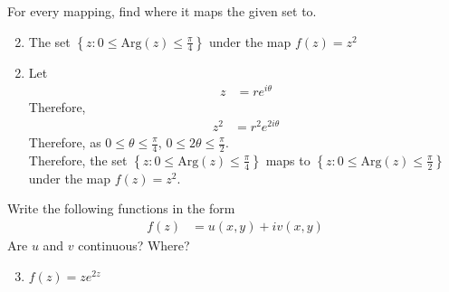 \documentclass[fleqn, a4paper, 11pt, oneside]{amsart}
\theoremstyle{definition}
\theoremstyle{theorem}
\newcommand{\Arg}{\mathrm{Arg}}
\begin{document}
\setcounter{question}{2}
\begin{question}
	For every mapping, find where it maps the given set to.
	\begin{enumerate}[label=({\alph*})]
		\setcounter{enumi}{1}
		\item The set $\left\{ z : 0 \le \Arg(z) \le \frac{\pi}{4} \right\}$ under the map $f(z) = z^2$
	\end{enumerate}
\end{question}

\begin{solution}
	\begin{enumerate}[label=({\alph*}), leftmargin=*]
		\setcounter{enumi}{1}
		\item
			Let
			\begin{align*}
				z &= r e^{i \theta}
			\end{align*}
			Therefore,
			\begin{align*}
				z^2 &= r^2 e^{2 i \theta}
			\end{align*}
			Therefore, as $0 \le \theta \le \frac{\pi}{4}$, $0 \le 2 \theta \le \frac{\pi}{2}$.\\
			Therefore, the set $\left\{ z : 0 \le \Arg(z) \le \frac{\pi}{4} \right\}$ maps to $\left\{ z : 0 \le \Arg(z) \le \frac{\pi}{2} \right\}$ under the map $f(z) = z^2$.
	\end{enumerate}
\end{solution}

\setcounter{question}{4}
\begin{question}
	Write the following functions in the form
	\begin{align*}
		f(z) &= u(x,y) + i v(x,y)
	\end{align*}
	Are $u$ and $v$ continuous?
	Where?
	\begin{enumerate}[label=({\alph*})]
		\setcounter{enumi}{2}
		\item $f(z) = z e^{2 z}$
	\end{enumerate}
\end{question}
\end{document}
